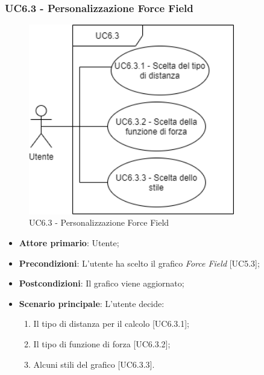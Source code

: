 \subsubsection{UC6.3 - Personalizzazione Force Field}
\begin{figure}[h]
\includegraphics[width=9cm]{Section/Images/UC6.3.png}
\centering
\caption{UC6.3 - Personalizzazione Force Field}
\end{figure}
\begin{itemize}
	\item \textbf{Attore primario}: Utente;
	
	\item \textbf{Precondizioni}: L'utente ha scelto il grafico \textit{Force Field} [UC5.3];
	
	\item \textbf{Postcondizioni}: Il grafico viene aggiornato;
	
	\item \textbf{Scenario principale}: L'utente decide:
	
\begin{enumerate}
\item Il tipo di distanza per il calcolo [UC6.3.1];
\item Il tipo di funzione di forza [UC6.3.2];
\item Alcuni stili del grafico [UC6.3.3].
\end{enumerate}	
		
\end{itemize}

